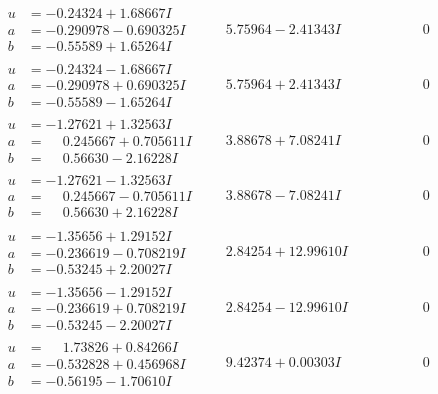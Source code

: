 \documentclass[1p]{elsarticle_modified}
\theoremstyle{definition}
\begin{document}
$$\begin{array}{c|c|c}
\begin{aligned}
u &= -0.24324 + 1.68667 I \\
a &= -0.290978 - 0.690325 I \\
b &= -0.55589 + 1.65264 I\end{aligned}
 & \phantom{-}5.75964 - 2.41343 I & \phantom{-0.000000 } 0 \\ \hline\begin{aligned}
u &= -0.24324 - 1.68667 I \\
a &= -0.290978 + 0.690325 I \\
b &= -0.55589 - 1.65264 I\end{aligned}
 & \phantom{-}5.75964 + 2.41343 I & \phantom{-0.000000 } 0 \\ \hline\begin{aligned}
u &= -1.27621 + 1.32563 I \\
a &= \phantom{-}0.245667 + 0.705611 I \\
b &= \phantom{-}0.56630 - 2.16228 I\end{aligned}
 & \phantom{-}3.88678 + 7.08241 I & \phantom{-0.000000 } 0 \\ \hline\begin{aligned}
u &= -1.27621 - 1.32563 I \\
a &= \phantom{-}0.245667 - 0.705611 I \\
b &= \phantom{-}0.56630 + 2.16228 I\end{aligned}
 & \phantom{-}3.88678 - 7.08241 I & \phantom{-0.000000 } 0 \\ \hline\begin{aligned}
u &= -1.35656 + 1.29152 I \\
a &= -0.236619 - 0.708219 I \\
b &= -0.53245 + 2.20027 I\end{aligned}
 & \phantom{-}2.84254 + 12.99610 I & \phantom{-0.000000 } 0 \\ \hline\begin{aligned}
u &= -1.35656 - 1.29152 I \\
a &= -0.236619 + 0.708219 I \\
b &= -0.53245 - 2.20027 I\end{aligned}
 & \phantom{-}2.84254 - 12.99610 I & \phantom{-0.000000 } 0 \\ \hline\begin{aligned}
u &= \phantom{-}1.73826 + 0.84266 I \\
a &= -0.532828 + 0.456968 I \\
b &= -0.56195 - 1.70610 I\end{aligned}
 & \phantom{-}9.42374 + 0.00303 I & \phantom{-0.000000 } 0 \\ \hline\begin{aligned}

\end{aligned}
\end{array}$$
\end{document}

